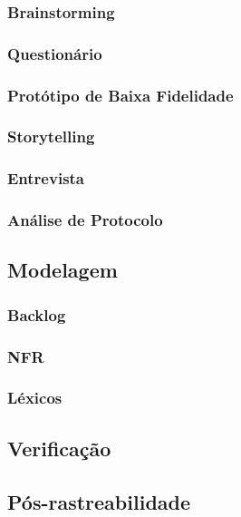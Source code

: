 \subsubsection{Brainstorming}

\subsubsection{Questionário}

\subsubsection{Protótipo de Baixa Fidelidade}

\subsubsection{Storytelling}

\subsubsection{Entrevista}

\subsubsection{Análise de Protocolo}

\subsection {Modelagem}

\subsubsection{Backlog}

\subsubsection{NFR}

\subsubsection{Léxicos}

\subsection {Verificação}

\subsection {Pós-rastreabilidade}

